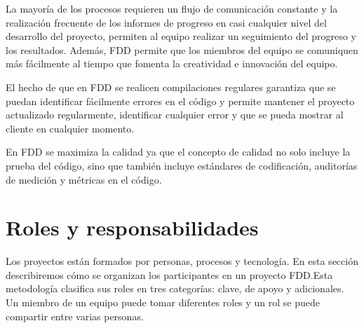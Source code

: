 \documentclass[11pt]{article}
\begin{document}
La mayoría de los procesos requieren un flujo de comunicación constante y la realización frecuente de los informes de progreso en casi cualquier nivel del desarrollo del proyecto, permiten al equipo realizar un seguimiento del progreso y los resultados. Además, FDD permite que los miembros del equipo se comuniquen más fácilmente al tiempo que fomenta la creatividad e innovación del equipo.

El hecho de que en FDD se realicen compilaciones regulares garantiza que se puedan identificar fácilmente errores en el código y permite mantener el proyecto actualizado regularmente, identificar cualquier error y que se pueda mostrar al cliente en cualquier momento. 

En FDD se maximiza la calidad ya que el concepto de calidad no solo incluye la prueba del código, sino que también incluye estándares de codificación, auditorías de medición y métricas en el código.

\section{Roles y responsabilidades}

Los proyectos están formados por personas, procesos y tecnología. En esta sección describiremos cómo se organizan los participantes en un proyecto FDD.Esta metodología clasifica sus roles en tres categorías: clave, de apoyo y adicionales. Un miembro de un equipo puede tomar diferentes roles y un rol se puede compartir entre varias personas.\\
\end{document}
